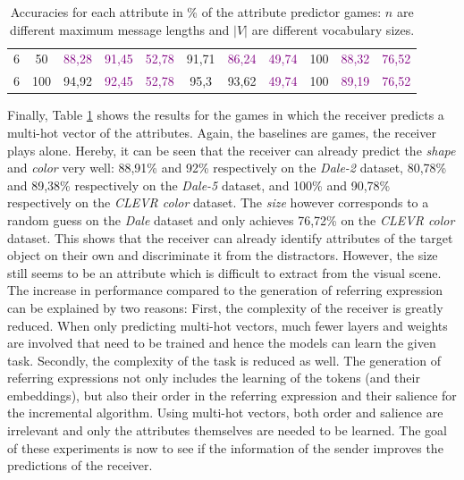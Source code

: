 \begin{table}[ht]
\begin{tabular}{cc|ccc|ccc|ccc}
        {6}                           & {50}    & \textcolor{purple}{88,28}           & \textcolor{purple}{91,45}           & \textcolor{purple}{52,78}                & {91,71}                         & \textcolor{purple}{86,24}       & \textcolor{purple}{49,74}      & {100}                           & \textcolor{purple}{88,32}       & \textcolor{purple}{76,52}      \\
        {6}                           & {100}   & {94,92}                             & \textcolor{purple}{92,45}           & \textcolor{purple}{52,78}                & {95,3}                          & {93,62}                         & \textcolor{purple}{49,74}      & {100}                           & \textcolor{purple}{89,19}       & \textcolor{purple}{76,52}      \\
        \bottomrule
    \end{tabular}
    \caption{Accuracies for each attribute in \% of the attribute predictor games: $n$ are different maximum message lengths and $|V|$ are different vocabulary sizes.}
    \label{tab:results:attribute-predictor-game}
\end{table}

Finally, Table \ref{tab:results:attribute-predictor-game} shows the results for the games in which the receiver predicts a multi-hot vector of the attributes.
Again, the baselines are games, the receiver plays alone.
Hereby, it can be seen that the receiver can already predict the \emph{shape} and \emph{color}  very well: 88,91\% and 92\% respectively on the \emph{Dale-2} dataset, 80,78\% and 89,38\% respectively on the \emph{Dale-5} dataset, and 100\% and 90,78\% respectively on the \emph{CLEVR color} dataset.
The \emph{size} however corresponds to a random guess on the \emph{Dale} dataset and only achieves 76,72\% on the \emph{CLEVR color} dataset.
This shows that the receiver can already identify attributes of the target object on their own and discriminate it from the distractors.
However, the size still seems to be an attribute which is difficult to extract from the visual scene.
The increase in performance compared to the generation of referring expression can be explained by two reasons:
First, the complexity of the receiver is greatly reduced.
When only predicting multi-hot vectors, much fewer layers and weights are involved that need to be trained and hence the models can learn the given task.
Secondly, the complexity of the task is reduced as well.
The generation of referring expressions not only includes the learning of the tokens (and their embeddings), but also their order in the referring expression and their salience for the incremental algorithm.
Using multi-hot vectors, both order and salience are irrelevant and only the attributes themselves are needed to be learned.
The goal of these experiments is now to see if the information of the sender improves the predictions of the receiver.

